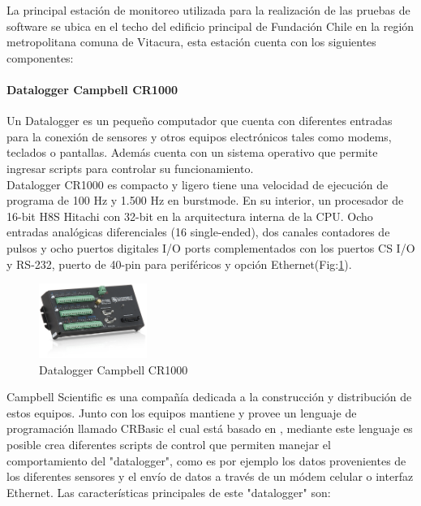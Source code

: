 La principal estación de monitoreo utilizada para la realización de las pruebas de software se ubica en el techo del edificio principal de Fundación Chile en la región metropolitana comuna de Vitacura, esta estación cuenta con los siguientes componentes:

\paragraph{Datalogger Campbell CR1000}
 
Un Datalogger es un pequeño computador que cuenta con diferentes entradas para la conexión de sensores y otros equipos electrónicos tales como modems, teclados o pantallas. Además cuenta con un sistema operativo que permite ingresar scripts para controlar su funcionamiento.\\

Datalogger CR1000 es compacto y ligero tiene una velocidad de ejecución de programa de 100 Hz y 1.500 Hz en burstmode. En su interior, un procesador de 16-bit H8S Hitachi con 32-bit en la arquitectura interna de la CPU.
Ocho entradas analógicas diferenciales (16 single-ended), dos canales contadores
de pulsos y ocho puertos digitales I/O ports complementados con los puertos CS I/O y RS-232, puerto de 40-pin para periféricos y opción Ethernet(Fig:\ref{cr1000}).

\begin{figure}[h!]
	\centering
	\includegraphics[width=100pt]{images/cr1000}
	\caption{Datalogger Campbell CR1000}
	\label{cr1000}
\end{figure}

Campbell Scientific es una compañía dedicada a la construcción y distribución de estos equipos. Junto con los equipos mantiene y provee un lenguaje de programación llamado CRBasic el cual está basado en , mediante este lenguaje es posible crea diferentes scripts de control que permiten manejar el comportamiento del "datalogger", como es por ejemplo los datos provenientes de los diferentes sensores y el envío de datos a través de un módem celular o interfaz Ethernet. Las características principales de este "datalogger" son:

